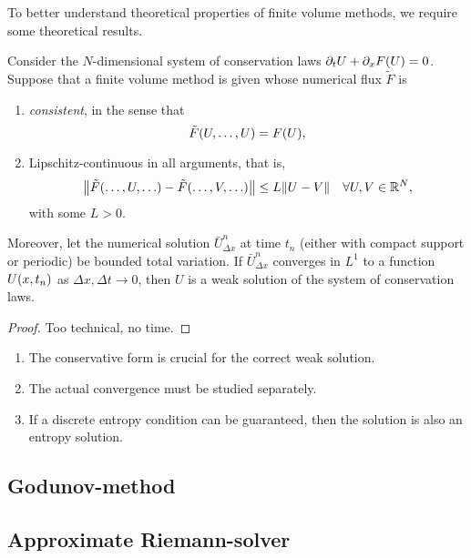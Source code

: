 To better understand theoretical properties of finite volume methods, we require some theoretical results.

\begin{theorem}
	Consider the \(N\)-dimensional system of conservation laws \(\partial_t U + \partial_x F\parentheses*{U} = 0\). Suppose that a finite volume method is given whose numerical flux \(\tilde{F}\) is
	\begin{enumerate}
		\item \emph{consistent}, in the sense that
		\[
			\tilde{F}\parentheses*{U, \ldots, U} = F\parentheses*{U},
		\]
		\item Lipschitz-continuous in all arguments, that is,
		\[
			\norm*{\tilde{F}\parentheses*{\ldots, U, \ldots} - \tilde{F}\parentheses*{\ldots, V, \ldots}} \le L\norm*{U - V} \quad \forall U, V \in \R^N,
		\]
		with some \(L > 0\).
	\end{enumerate}
	Moreover, let the numerical solution \(\bar{U}_{\Delta x}^n\) at time \(t_n\) (either with compact support or periodic) be bounded total variation.
	If \(\bar{U}_{\Delta x}^n\) converges in \(L^1\) to a function \(U\parentheses*{x, t_n}\) as \(\Delta x, \Delta t \to 0\), then \(U\) is a weak solution of the system of conservation laws.
\end{theorem}

\begin{proof}
	Too technical, no time.
\end{proof}

\begin{remark}
	\begin{enumerate}
		\item The conservative form is crucial for the correct weak solution.
		\item The actual convergence must be studied separately.
		\item If a discrete entropy condition can be guaranteed, then the solution is also an entropy solution.
	\end{enumerate}
\end{remark}

\begin{example}

\end{example}


\subsection{Godunov-method}


\subsection{Approximate Riemann-solver}